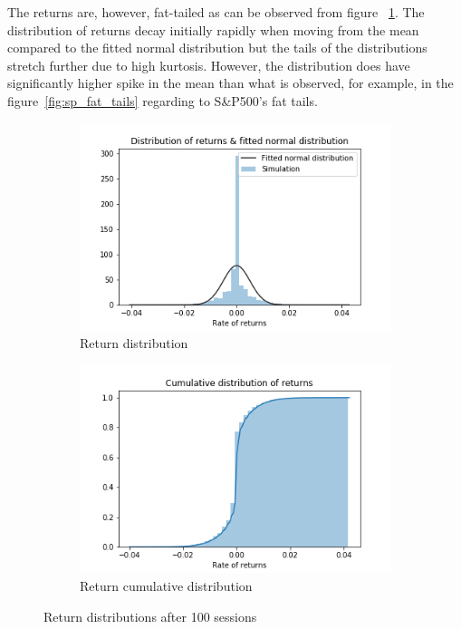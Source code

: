 The returns are, however, fat-tailed as can be observed from figure 
~\ref{fig:basic_return_fitdistr}. The distribution of returns decay
initially rapidly when moving from the mean compared to the fitted
normal distribution but the tails of the distributions stretch
further due to high kurtosis. However, the distribution does have
significantly higher spike in the mean than what is observed, for 
example, in the figure~\ref{fig:sp_fat_tails} regarding to S\&P500's
fat tails. 


\begin{figure}
    \centering
    \begin{subfigure}{.5\textwidth}
      \centering
      \includegraphics[width=\linewidth]{plots/basic_fat_tails.png}
      \caption{Return distribution}
      \label{fig:basic_return_fitdistr}
    \end{subfigure}%
    \begin{subfigure}{.5\textwidth}
      \centering
      \includegraphics[width=\linewidth]{plots/basic_fat_tails_cumdist.png}
      \caption{Return cumulative distribution}
      \label{fig:basic_return_cumdistr}
    \end{subfigure}
    \caption{Return distributions after 100 sessions}
    \label{fig:basic_return_distr}
\end{figure}


